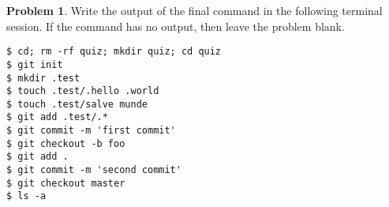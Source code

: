 \documentclass[10pt]{article}
\theoremstyle{definition}
\newtheorem{problem}{Problem}
\begin{document}
\filbreak
\vspace{1in}
\begin{problem}
    Write the output of the final command in the following terminal session.
    If the command has no output, then leave the problem blank.
\end{problem}
\begin{lstlisting}
$ cd; rm -rf quiz; mkdir quiz; cd quiz
$ git init
$ mkdir .test
$ touch .test/.hello .world
$ touch .test/salve munde
$ git add .test/.*
$ git commit -m 'first commit'
$ git checkout -b foo
$ git add .
$ git commit -m 'second commit'
$ git checkout master
$ ls -a
\end{lstlisting}
\end{document}
